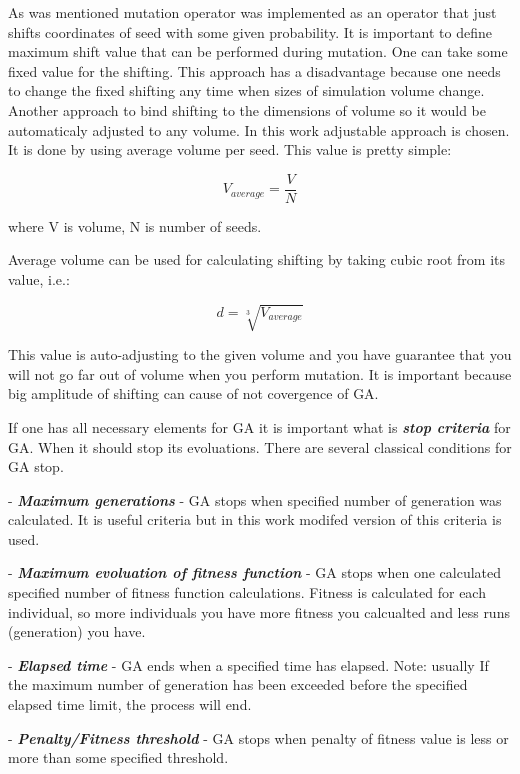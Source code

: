 \documentclass[12pt]{report}
\begin{document}
As was mentioned mutation operator was implemented as an operator that just shifts coordinates of seed with some given probability. It is important to define maximum shift value that can be performed during mutation. One can take some fixed value for the shifting. This approach has a disadvantage because one needs to change the fixed shifting any time when sizes of simulation volume change. Another approach to bind shifting to the dimensions of volume so it would be automaticaly adjusted to any volume. In this work adjustable approach is chosen. It is done by using average volume per seed. This value is pretty simple:

\begin{equation} \label{avgvolume}
V_{average} = \frac{V}{N}
\end{equation}
\bigbreak

where V is volume, N is number of seeds.

Average volume can be used for calculating shifting by taking cubic root from its value, i.e.:

\begin{equation} \label{shift}
d = \sqrt[3]{V_{average}}
\end{equation}
\bigbreak

This value is auto-adjusting to the given volume and you have guarantee that you will not go far out of volume when you perform mutation. It is important because big amplitude of shifting can cause of not covergence of GA.
 
If one has all necessary elements for GA it is important what is \textit{\textbf{stop criteria}} for GA. When it should stop its evoluations. There are several classical conditions for GA stop. 

- \textit{\textbf{Maximum generations}} - GA stops when specified number of generation was calculated. It is useful criteria but in this work modifed version of this criteria is used. 

- \textit{\textbf{Maximum evoluation of fitness function}} - GA stops when one calculated specified number of fitness function calculations. Fitness is calculated for each individual, so more individuals you have more fitness you calcualted and less runs (generation) you have.

- \textit{\textbf{Elapsed time}} - GA ends when a specified time has elapsed.
Note: usually If the maximum number of generation has been exceeded before the specified elapsed time limit, the process will end.

- \textit{\textbf{Penalty/Fitness threshold}} - GA stops when penalty of fitness value is less or more than some specified threshold.
\end{document}
